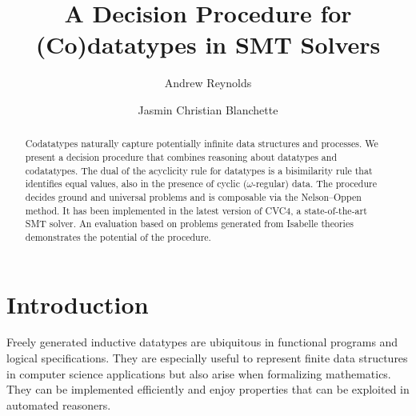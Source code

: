
\makeatletter
\ps@myheadings
\makeatother







\title{A Decision Procedure for (Co)datatypes in SMT Solvers}

\author {Andrew Reynolds \and Jasmin Christian Blanchette}

\maketitle

\begin{abstract}
Codatatypes naturally capture potentially infinite data structures and
processes. We present a decision procedure that combines reasoning about
datatypes and codatatypes. The dual of the acyclicity rule for datatypes is a
bisimilarity rule that identifies equal values, also in the presence of cyclic
($\omega$-regular) data. The procedure decides ground and universal
problems and is composable via the Nelson--Oppen method. It has been
implemented in the latest version of CVC4, a state-of-the-art SMT solver. An
evaluation based on problems generated from Isabelle theories demonstrates the
potential of the procedure.
\end{abstract}

\setcounter{footnote}{0}

\section{Introduction}
\label{sec:introduction}

Freely generated inductive datatypes are ubiquitous in functional programs and
logical specifications. They are especially
useful to represent finite data structures in computer science applications but
also arise when formalizing mathematics.
They can be implemented efficiently and enjoy
properties that can be exploited in automated reasoners. 
%

